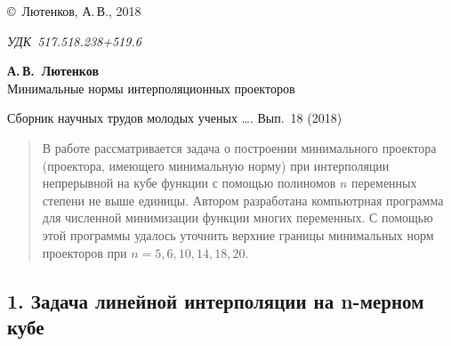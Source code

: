 \documentclass[14pt,a4paper]{extbook}
\begin{document}
\begin{flushleft}
\copyright~Лютенков, А.\,В., 2018
\end{flushleft}

{\sl УДК~517.518.238+519.6}\\ %
\medskip

\begin{center}
{\bf А.\,В.~Лютенков}\\[0.2cm] %
{\Large Минимальные нормы интерполяционных проекторов}%
\end{center}

  {Сборник научных трудов молодых ученых \ldots\;.
Вып.~18 (2018)}

\begin{quotation}
\small В работе рассматривается задача о построении минимального проектора (проектора, имеющего минимальную норму) при интерполяции непрерывной на кубе функции с помощью полиномов $n$ переменных степени не выше единицы. 
Автором разработана компьютрная программа для численной минимизации функции 
многих переменных. С помощью этой программы удалось уточнить верхние границы 
минимальных норм проекторов при $n=5,6,10,14,18,20$.
\end{quotation}


\subsection*{1. Задача линейной интерполяции на n-мерном кубе}  %
\end{document}
